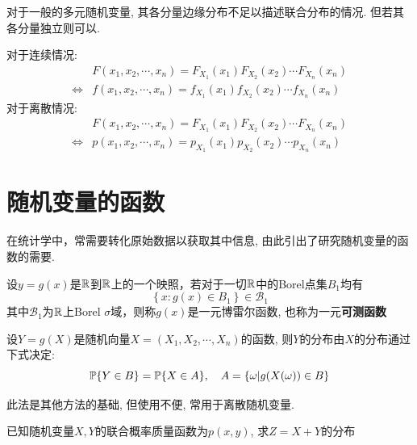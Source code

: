 \begin{remark}
    对于一般的多元随机变量, 其各分量边缘分布不足以描述联合分布的情况. 但若其各分量独立则可以.
\end{remark}

\begin{theorem}\label{thm:indep_cmf}
    对于连续情况:
    \begin{align*}
                        & F(x_1,x_2,\cdots ,x_n) = F_{X_1}(x_1)F_{X_2}(x_2)\cdots F_{X_n}(x_n) \\
        \Leftrightarrow & f(x_1,x_2,\cdots ,x_n) = f_{X_1}(x_1)f_{X_2}(x_2)\cdots f_{X_n}(x_n)
    \end{align*}
    对于离散情况:
    \begin{align*}
                        & F(x_1,x_2,\cdots ,x_n) = F_{X_1}(x_1)F_{X_2}(x_2)\cdots F_{X_n}(x_n) \\
        \Leftrightarrow & p(x_1,x_2,\cdots ,x_n) = p_{X_1}(x_1)p_{X_2}(x_2)\cdots p_{X_n}(x_n)
    \end{align*}
\end{theorem}



\section{随机变量的函数}

在统计学中，常需要转化原始数据以获取其中信息, 由此引出了研究随机变量的函数的需要.

\begin{definition}[可测函数]
    设$y =g(x)$是$\R$到$\R$上的一个映照，若对于一切$\R$中的Borel点集$B_1$均有
    \[\left\{ x:g(x) \in B_1 \right\} \in \mathcal{B}_1 \]
    其中$\mathcal{B}_1$为$\R$上Borel $\sigma$域，则称$g(x)$是一元博雷尔函数, 也称为一元\textbf{可测函数}
\end{definition}

\begin{theorem}[事件法]
    设$Y=g(X)$是随机向量$X=(X_1,X_2,\cdots ,X_n)$的函数, 则$Y$的分布由$X$的分布通过下式决定:
    \[ \P\{Y \in B\} = \P\{X \in A\}, \quad A=\{ \omega |g(X(\omega))\in B\} \]
\end{theorem}

此法是其他方法的基础, 但使用不便, 常用于离散随机变量.

\begin{example}\label{exp:sum_of_pmf}
    已知随机变量$X,Y$的联合概率质量函数为$p(x,y)$, 求$Z=X+Y$的分布
\end{example}

